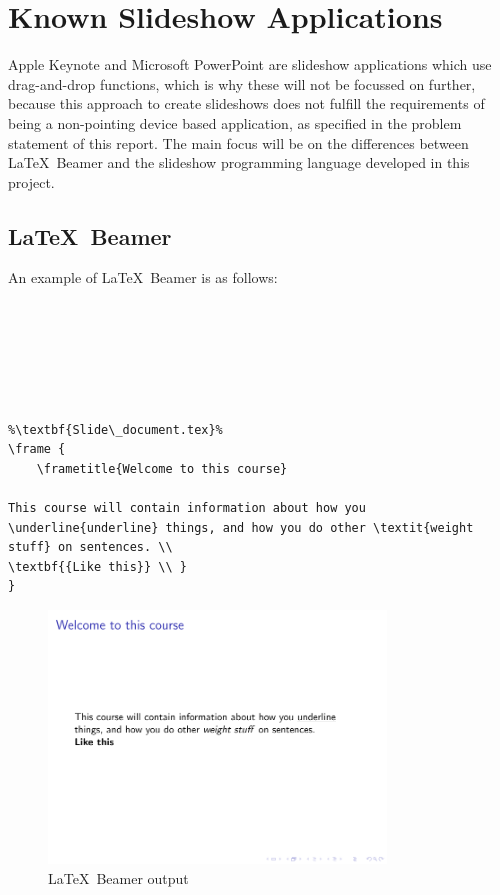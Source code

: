 \chapter{Known Slideshow Applications}
Apple Keynote and Microsoft PowerPoint are slideshow applications which use drag-and-drop functions, which is why these will not be focussed on further, because this approach to create slideshows does not fulfill the requirements of being a non-pointing device based application, as specified in the problem statement of this report. The main focus will be on the differences between \LaTeX~Beamer and the slideshow programming language developed in this project.

\section{\LaTeX~Beamer}
An example of \LaTeX~Beamer is as follows:

\begin{lstlisting}[frame=single, caption={Beamer example}, label=lst_beamer]
%\textbf{Main\_document.tex}%






%\textbf{Slide\_document.tex}%
\frame {
	\frametitle{Welcome to this course}

This course will contain information about how you \underline{underline} things, and how you do other \textit{weight stuff} on sentences. \\
\textbf{{Like this}} \\	}
}
\end{lstlisting}

\begin{figure}[H]
	\centering
		\includegraphics[width=0.8\textwidth]{text/beamer_example.pdf}
	\caption{\LaTeX~Beamer output}
	\label{fig:beamer_example}
\end{figure}

